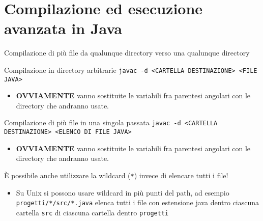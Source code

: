 \documentclass[xcolor=dvipsnames,presentation]{beamer}
\begin{document}
\section{Compilazione ed esecuzione avanzata in Java}


\begin{frame}{Compilazione di più file da qualunque directory verso una qualunque directory}
  \begin{block}{Compilazione in directory arbitrarie}
    \texttt{javac {\color{red}-d <CARTELLA DESTINAZIONE>} <FILE JAVA>}
    \begin{itemize}
      \item \textbf{OVVIAMENTE} vanno sostituite le variabili fra parentesi angolari con le
directory che andranno usate.
    \end{itemize}
  \end{block}
  \begin{block}{Compilazione di più file in una singola passata}
    \texttt{javac -d <CARTELLA DESTINAZIONE> {\color{red}<ELENCO DI FILE JAVA>}}
    \begin{itemize}
      \item \textbf{OVVIAMENTE} vanno sostituite le variabili fra parentesi angolari con le
directory che andranno usate.
    \end{itemize}
  \end{block}
  È possibile anche utilizzare la wildcard (\texttt{*}) invece di elencare tutti i file!
  \begin{itemize}
    \item Su Unix si possono usare wildcard in più punti del path, ad esempio
\texttt{progetti/*/src/*.java} elenca tutti i file con estensione java dentro ciascuna cartella
\texttt{src} di ciascuna cartella dentro \texttt{progetti}
  \end{itemize}
\end{frame}
\end{document}
